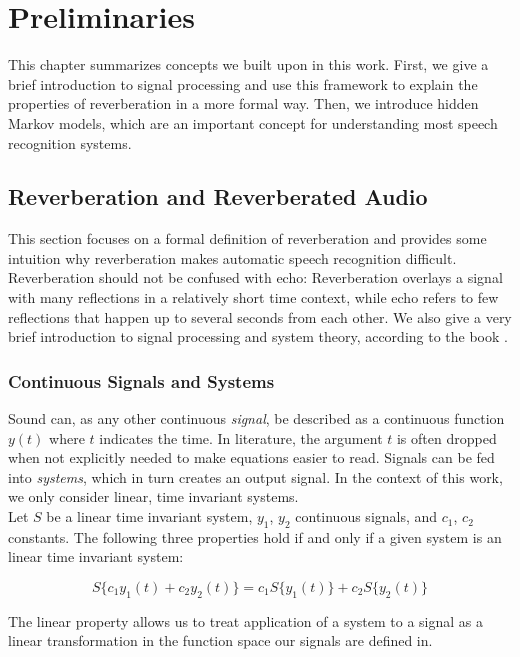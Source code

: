 \chapter{Preliminaries}
\label{ch:preleminaries}

This chapter summarizes concepts we built upon in this work. First, we give a brief introduction to signal processing and use this framework to explain the properties of reverberation in a more formal way. Then, we introduce hidden Markov models, which are an important concept for understanding most speech recognition systems. 

\section{Reverberation and Reverberated Audio}
\label{sec:reverberation}

This section focuses on a formal definition of reverberation and provides some intuition why reverberation makes automatic speech recognition difficult. Reverberation should not be confused with echo: Reverberation overlays a signal with many reflections in a relatively short time context, while echo refers to few reflections that happen up to several seconds from each other. We also give a very brief introduction to signal processing and system theory, according to the book \cite{leon2015signale}.

\subsection{Continuous Signals and Systems}

Sound can, as any other continuous \textit{signal}, be described as a continuous function $y(t)$ where $t$ indicates the time. In literature, the argument $t$ is often dropped  when not explicitly needed to make equations easier to read.  
Signals can be fed into \textit{systems}, which in turn creates an output signal. In the context of this work, we only consider linear, time invariant systems. 
\\
Let $S$ be a linear time invariant system, $y_1$, $y_2$ continuous signals, and $c_1$, $c_2$ constants. The following three properties hold if and only if a given system is an linear time invariant system: 

\[S\{c_1 y_1(t) + c_2 y_2(t)\} = c_1 S\{y_1(t)\} + c_2 S\{y_2(t)\} \tag{linearity}\]

The linear property allows us to treat application of a system to a signal as a linear transformation in the function space our signals are defined in. 

